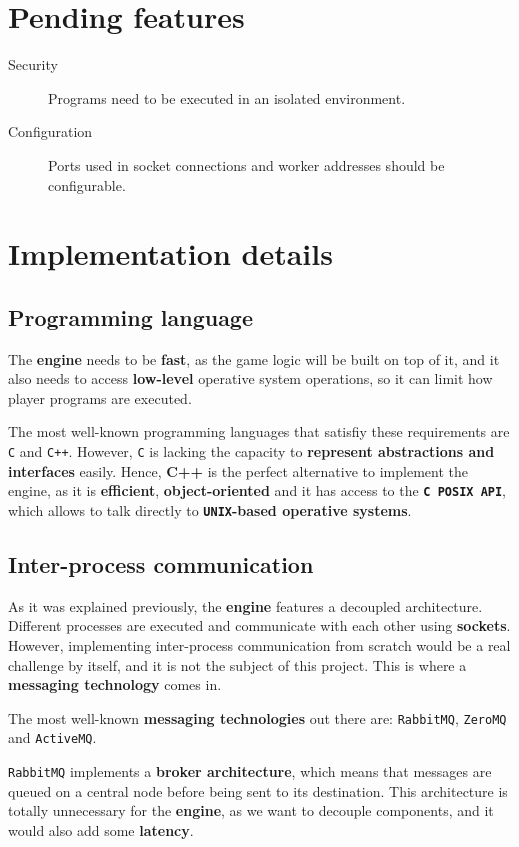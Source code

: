 \documentclass[a4paper,11pt,titlepage,abstract,numbers=noenddot,automark,mnsy,intlimits,rgb,dvipsnames]{report}
\begin{document}
\section{Pending features}
\begin{description}
\item[Security]
Programs need to be executed in an isolated environment.
\item[Configuration]
Ports used in socket connections and worker addresses should be configurable.
\end{description}
\section{Implementation details}
\subsection{Programming language}
\indent
The \textbf{engine} needs to be \textbf{fast}, as the game logic will be built on top of it, and it also needs to access
\textbf{low-level} operative system operations, so it can limit how player programs are executed.

The most well-known programming languages that satisfiy these requirements are \texttt{C} and \texttt{C++}. However, \texttt{C}  is lacking
the capacity to \textbf{represent abstractions and interfaces} easily. Hence, \textbf{C++} is the perfect alternative to implement
the engine, as it is \textbf{efficient}, \textbf{object-oriented} and it has access to the \textbf{\texttt{C POSIX API}}, which allows to talk
directly to \textbf{\texttt{UNIX}-based operative systems}.
\subsection{Inter-process communication}
\indent
As it was explained previously, the \textbf{engine} features a decoupled architecture. Different processes are
executed and communicate with each other using \textbf{sockets}. However, implementing inter-process communication from
scratch would be a real challenge by itself, and it is not the subject of this project. This is where a
\textbf{messaging technology} comes in.

The most well-known \textbf{messaging technologies} out there are: \texttt{RabbitMQ}, \texttt{ZeroMQ} and \texttt{ActiveMQ}.

\texttt{RabbitMQ} implements
a \textbf{broker architecture}, which means that messages are queued on a central node before being sent to its destination.
This architecture is totally unnecessary for the \textbf{engine}, as we want to decouple components, and it would also add
some \textbf{latency}.
\end{document}
